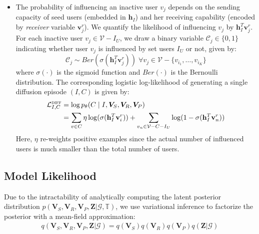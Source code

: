 \documentclass[sigconf]{acmart}
\def\rvh{{\mathbf{h}}}
\def\rvv{{\mathbf{v}}}
\def\mV{{\bm{V}}}
\def\mZ{{\bm{Z}}}
\def\gC{{\mathcal{C}}}
\def\gG{{\mathcal{G}}}
\def\gL{{\mathcal{L}}}
\def\gV{{\mathcal{V}}}
\def\sT{{\mathbb{T}}}
\begin{document}
\begin{itemize}[leftmargin=*]
\item The probability of influencing an inactive user $v_j$ depends on the sending capacity of seed users (embedded in $\rvh_I$) and her receiving capability (encoded by \emph{receiver} variable $\rvv_j^r$).
We quantify the likelihood of influencing $v_j$ by $\rvh_{I}^T \rvv_j^r$.
For each inactive user $v_j \in \gV- I_U$, we draw a binary variable $\gC_j \in \{0,1\}$ indicating whether user $v_j$ is influenced by set users $I_U$ or not, given by:
\vspace{-3pt}
\begin{equation}
\gC_j \sim Ber (\sigma(\rvh_{I}^T \rvv_j^r)) \; \forall v_j \in \gV- \{ v_{i_1}, \dots, v_{i_K}\}
\label{eqn:diffusion_gen}
\end{equation}
\noindent where $\sigma(\cdot)$ is the sigmoid function and $Ber(\cdot)$ is the Bernoulli distribution.
The corresponding logistic log-likelihood of generating a single diffusion episode $(I, C)$ is given by:
\vspace{-2pt}
\begin{align}
\gL^{\textsc{diff}}_{I,C} &= \log p_{\theta} (C \mid I, \mV_S, \mV_R, \mV_{P})  \\ \nonumber \vspace{-3pt}
&=  \sum\limits_{v \in C} \eta \log (\sigma(\rvh_{I}^T \rvv_i^r)) +  \sum\limits_{v_n \in \gV - C - I_U} \log (1-  \sigma(\rvh_{I}^T \rvv_n^r ))
\end{align}
Here, $\eta$ re-weights positive examples since the actual number of influenced users is much smaller than the total number of users.
\end{itemize}


\subsection{Model Likelihood}
\label{sec:likelihood}

Due to the intractability of analytically computing the latent posterior distribution $p (\mV_S, \mV_R, \mV_{P}, \mZ | \gG, \sT)$, we use variational inference to factorize the posterior with a mean-field approximation:
\vspace{-3pt}
\begin{align}
q(\mV_S, \mV_R, \mV_P, \mZ | \gG) =   q(\mV_S ) q(\mV_R) q(\mV_P) q(\mZ | \gG)
\label{eqn:mean_field}
\end{align}
\end{document}
